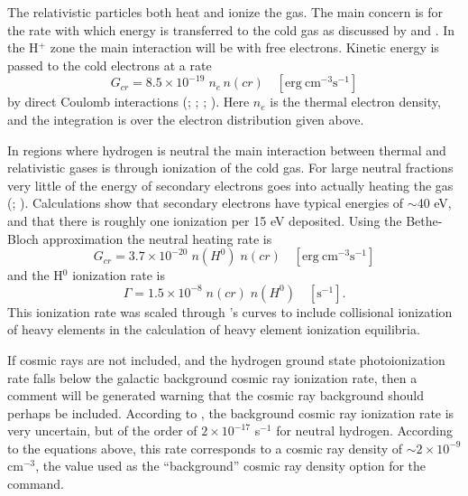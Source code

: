 The relativistic particles both heat and ionize the gas.  The main concern
is for the rate with which energy is transferred to the cold gas
as discussed by \citet{Lea1978} and \citet{Ginzburg1964}.
In the H$^+$ zone the main
interaction will be with free electrons.
Kinetic energy is passed to the
cold electrons at a rate
\begin{equation}
{G_{cr}} = 8.5 \times {10^{ - 19}}\;{n_e}\,n(cr)
\quad [\mathrm{erg~cm}^{-3} \mathrm{s}^{-1}]
\end{equation}
by direct Coulomb interactions (\citealp{Jackson1975}; \citealp{Spitzer1962}; \citealp{Ginzburg1964};
\citealp{Pacholczyk1970}).  Here $n_e$ is the thermal electron density,
and the integration is over the electron distribution given above.

In regions where hydrogen is neutral the main interaction between thermal
and relativistic gases is through ionization of the cold gas.  For large
neutral fractions very little of the energy of secondary electrons goes
into actually heating the gas (\citealp{Rossi1952};
\citealp{Spitzer1968}).
Calculations show that secondary electrons have typical energies of $\sim$40
eV, and that there is roughly one ionization per 15 eV deposited.  Using
the Bethe-Bloch approximation \citep{Ginzburg1964} the neutral
heating rate is
\begin{equation}
{G_{cr}} = 3.7 \times {10^{ - 20}}\;n\left( {{H^0}} \right)\;n\left( {cr}
\right)\quad
 [\mathrm{erg~cm}^{-3} \mathrm{s}^{-1}]
\end{equation}
and the H$^0$ ionization rate is
\begin{equation}
\Gamma  = 1.5 \times {10^{ - 8}}\;n(cr)\;n\left( {{H^0}} \right)
\quad  [\mathrm{s}^{-1}].
\end{equation}
This ionization rate was scaled through \citet{Lotz1967}'s curves to include
collisional ionization of heavy elements in the calculation of heavy element
ionization equilibria.

If cosmic rays are not included, and the hydrogen ground state
photoionization rate falls below the galactic background cosmic ray
ionization rate, then a comment will be generated warning that the cosmic
ray background should perhaps be included.  According to \citet{Spitzer1978},
the background cosmic ray ionization rate is very uncertain, but of the
order of $2\times 10^{-17}$ s$^{-1}$ for neutral hydrogen.  According to the equations above,
this rate corresponds to a cosmic ray density of $\sim 2\times 10^{-9}$
cm$^{-3}$, the value
used as the ``background'' cosmic ray density option for the
 command.

